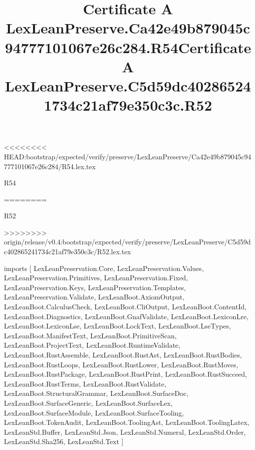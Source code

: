 <<<<<<<< HEAD:bootstrap/expected/verify/preserve/LexLeanPreserve/Ca42e49b879045c94777101067e26c284/R54.lex.tex
\begin{lexlean}{R54}
\title{Certificate A LexLeanPreserve.Ca42e49b879045c94777101067e26c284.R54}
========
\begin{lexlean}{R52}
\title{Certificate A LexLeanPreserve.C5d59dc402865241734c21af79e350c3c.R52}
>>>>>>>> origin/release/v0.4:bootstrap/expected/verify/preserve/LexLeanPreserve/C5d59dc402865241734c21af79e350c3c/R52.lex.tex
\begin{coremodule}
imports [
  LexLeanPreservation.Core,
  LexLeanPreservation.Values,
  LexLeanPreservation.Primitives,
  LexLeanPreservation.Fixed,
  LexLeanPreservation.Keys,
  LexLeanPreservation.Templates,
  LexLeanPreservation.Validate,
  LexLeanBoot.AxiomOutput,
  LexLeanBoot.CalculusCheck,
  LexLeanBoot.CliOutput,
  LexLeanBoot.ContentId,
  LexLeanBoot.Diagnostics,
  LexLeanBoot.GnafValidate,
  LexLeanBoot.LexiconLre,
  LexLeanBoot.LexiconLse,
  LexLeanBoot.LockText,
  LexLeanBoot.LseTypes,
  LexLeanBoot.ManifestText,
  LexLeanBoot.PrimitiveScan,
  LexLeanBoot.ProjectText,
  LexLeanBoot.RuntimeValidate,
  LexLeanBoot.RustAssemble,
  LexLeanBoot.RustAst,
  LexLeanBoot.RustBodies,
  LexLeanBoot.RustLoops,
  LexLeanBoot.RustLower,
  LexLeanBoot.RustMoves,
  LexLeanBoot.RustPackage,
  LexLeanBoot.RustPrint,
  LexLeanBoot.RustSucceed,
  LexLeanBoot.RustTerms,
  LexLeanBoot.RustValidate,
  LexLeanBoot.StructuralGrammar,
  LexLeanBoot.SurfaceDoc,
  LexLeanBoot.SurfaceGeneric,
  LexLeanBoot.SurfaceLex,
  LexLeanBoot.SurfaceModule,
  LexLeanBoot.SurfaceTooling,
  LexLeanBoot.TokenAudit,
  LexLeanBoot.ToolingAst,
  LexLeanBoot.ToolingLatex,
  LexLeanStd.Buffer,
  LexLeanStd.Json,
  LexLeanStd.Numeral,
  LexLeanStd.Order,
  LexLeanStd.Sha256,
  LexLeanStd.Text
]


\end{coremodule}
\end{lexlean}
\end{lexlean}
